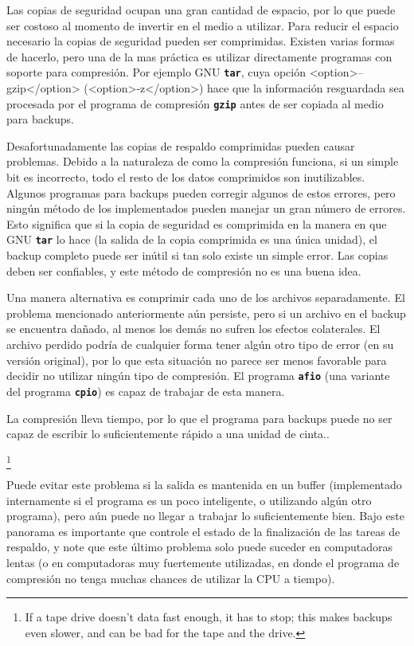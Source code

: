 ﻿\documentclass[12pt]{article}
\begin{document}
	

Las copias de seguridad ocupan una gran cantidad de espacio, por lo que
puede ser costoso al momento de invertir en el medio a utilizar.
Para reducir el espacio necesario la copias de seguridad pueden ser comprimidas. Existen varias 
formas de hacerlo, pero una de la mas práctica es utilizar directamente programas con soporte para compresión.
Por ejemplo GNU \texttt{\textbf{tar}}, cuya opción <option>--gzip</option> (<option>-z</option>) 
hace que la información resguardada sea procesada por el programa de compresión 
\texttt{\textbf{gzip}} antes de ser copiada al medio para backups.
	
	

Desafortunadamente las copias de respaldo comprimidas pueden causar 
problemas. Debido a la naturaleza de como la compresión funciona, si un simple 
bit es incorrecto, todo el resto de los datos comprimidos son 
inutilizables. Algunos programas para backups pueden corregir algunos de 
estos errores, pero ningún método de los implementados 
pueden manejar un gran número de errores. Esto significa que si la copia de 
seguridad es comprimida en la manera en que GNU \texttt{\textbf{tar}} lo hace (la salida
de la copia comprimida es una única unidad), el backup completo puede 
ser inútil si tan solo existe un simple error.
Las copias deben ser 
confiables, y este método de compresión no es una buena idea.
	
	

Una manera alternativa es comprimir cada uno de los archivos separadamente. 
El problema mencionado anteriormente aún persiste, pero si un archivo en el backup se 
encuentra dañado, al menos los demás no sufren los efectos colaterales.
El archivo perdido podría de cualquier forma tener algún otro tipo de error (en su versión original), por 
lo que esta situación no parece ser menos favorable para decidir no utilizar ningún tipo de compresión.
El programa \texttt{\textbf{afio}} (una variante del programa \texttt{\textbf{cpio}}) es capaz de trabajar de esta manera.
	
	

La compresión lleva tiempo, por lo que el programa para backups puede 
no ser capaz de escribir lo suficientemente rápido a una unidad de cinta..
	
		\footnote{If a tape drive doesn't data fast enough,
		it has to stop; this makes backups even slower, and can
		be bad for the tape and the drive.}
		

Puede evitar este problema si la
salida es mantenida en un buffer (implementado internamente si el programa es 
un poco inteligente, o utilizando algún otro programa), pero aún puede no llegar a 
trabajar lo suficientemente bien. Bajo este panorama es importante que controle
el estado de la finalización de las tareas de respaldo, y note que este último problema
solo puede suceder en computadoras lentas (o en computadoras muy fuertemente utilizadas,
en donde el programa de compresión no tenga muchas chances de utilizar la CPU a tiempo).
\end{document}
